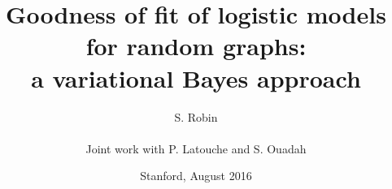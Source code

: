 \documentclass[10pt]{beamer}
\newcommand{\fignet}{../FIGURES}
\begin{document}

\title[GOF for graph models]{Goodness of fit of logistic models for random graphs: \\
a variational Bayes approach}

\author[S. Robin]{S. Robin \\ ~\\
  Joint work with P. Latouche and S. Ouadah}


\date{Stanford, August 2016}

\maketitle

\end{document}
